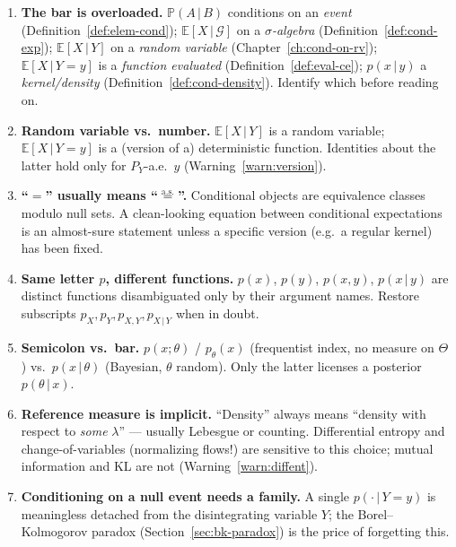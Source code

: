 \documentclass[11pt,oneside]{report}
\theoremstyle{plain}
\theoremstyle{definition}
\theoremstyle{remark}
\newcommand{\Prob}{\mathbb{P}}
\newcommand{\E}{\mathbb{E}}
\newcommand{\Gcal}{\mathcal{G}}
\newcommand{\eqas}{\overset{\text{a.s.}}{=}}
\newcommand{\given}{\,\vert\,}
\numberwithin{equation}{chapter}
\begin{document}
\begin{enumerate}[leftmargin=1.6em,itemsep=0.5em]
\item \textbf{The bar is overloaded.} $\Prob(A\given B)$ conditions on an
\emph{event} (Definition~\ref{def:elem-cond}); $\E[X\given\Gcal]$ on a
\emph{$\sigma$-algebra} (Definition~\ref{def:cond-exp}); $\E[X\given Y]$ on
a \emph{random variable} (Chapter~\ref{ch:cond-on-rv}); $\E[X\given Y=y]$ is
a \emph{function evaluated} (Definition~\ref{def:eval-ce}); $p(x\given y)$ a
\emph{kernel/density} (Definition~\ref{def:cond-density}). Identify which
before reading on.

\item \textbf{Random variable vs.\ number.} $\E[X\given Y]$ is a random
variable; $\E[X\given Y=y]$ is a (version of a) deterministic function.
Identities about the latter hold only for $P_Y$-a.e.\ $y$
(Warning~\ref{warn:version}).

\item \textbf{``$=$'' usually means ``$\eqas$''.} Conditional objects are
equivalence classes modulo null sets. A clean-looking equation between
conditional expectations is an almost-sure statement unless a specific
version (e.g.\ a regular kernel) has been fixed.

\item \textbf{Same letter $p$, different functions.} $p(x)$, $p(y)$,
$p(x,y)$, $p(x\given y)$ are distinct functions disambiguated only by their
argument names. Restore subscripts $p_X,p_Y,p_{X,Y},p_{X\given Y}$ when in
doubt.

\item \textbf{Semicolon vs.\ bar.} $p(x;\theta)$ / $p_\theta(x)$
(frequentist index, no measure on $\Theta$) vs.\ $p(x\given\theta)$
(Bayesian, $\theta$ random). Only the latter licenses a posterior
$p(\theta\given x)$.

\item \textbf{Reference measure is implicit.} ``Density'' always means
``density with respect to \emph{some} $\lambda$'' --- usually Lebesgue or
counting. Differential entropy and change-of-variables (normalizing flows!)
are sensitive to this choice; mutual information and KL are not
(Warning~\ref{warn:diffent}).

\item \textbf{Conditioning on a null event needs a family.} A single
$p(\cdot\given Y=y)$ is meaningless detached from the disintegrating
variable $Y$; the Borel--Kolmogorov paradox (Section~\ref{sec:bk-paradox})
is the price of forgetting this.


\end{enumerate}
\end{document}
